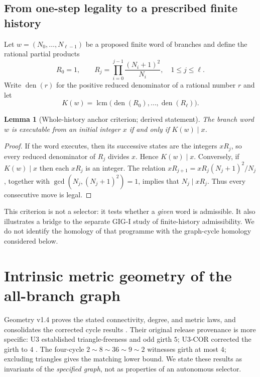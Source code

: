 \documentclass[11pt,a4paper]{article}
\newtheorem{lemma}[theorem]{Lemma}
\theoremstyle{definition}\newtheorem{definition}[theorem]{Definition}
\begin{document}
\subsection{From one-step legality to a prescribed finite history}
Let $w=(N_0,\ldots,N_{\ell-1})$ be a proposed finite word of branches and define the rational partial products
\begin{equation}\label{eq:partials}
R_0=1,\qquad R_j=\prod_{i=0}^{j-1}\frac{(N_i+1)^2}{N_i},\quad 1\le j\le\ell.
\end{equation}
Write $\operatorname{den}(r)$ for the positive reduced denominator of a rational number $r$ and let
\begin{equation}\label{eq:K}
K(w)=\operatorname{lcm}\bigl(\operatorname{den}(R_0),\ldots,\operatorname{den}(R_\ell)\bigr).
\end{equation}
\begin{lemma}[Whole-history anchor criterion; derived statement]\label{lem:history}
The branch word $w$ is executable from an initial integer $x$ if and only if $K(w)\mid x$.
\end{lemma}
\begin{proof}
If the word executes, then its successive states are the integers $xR_j$, so every reduced denominator of $R_j$ divides $x$. Hence $K(w)\mid x$. Conversely, if $K(w)\mid x$ then each $xR_j$ is an integer. The relation $xR_{j+1}=xR_j(N_j+1)^2/N_j$, together with $\gcd(N_j,(N_j+1)^2)=1$, implies that $N_j\mid xR_j$. Thus every consecutive move is legal.
\end{proof}

This criterion is not a selector: it tests whether a \emph{given} word is admissible. It also illustrates a bridge to the separate GIG-I study of finite-history admissibility. We do not identify the homology of that programme with the graph-cycle homology considered below.

\section{Intrinsic metric geometry of the all-branch graph}
\label{sec:geometry}
Geometry v1.4 proves the stated connectivity, degree, and metric laws, and consolidates the corrected cycle results \cite{geometry}. Their original release provenance is more specific: U3 established triangle-freeness and odd girth $5$; U3-COR corrected the girth to $4$ \cite{u3,u3cor}. The four-cycle $2\sim8\sim36\sim9\sim2$ witnesses girth at most $4$; excluding triangles gives the matching lower bound. We state these results as invariants of the \emph{specified graph}, not as properties of an autonomous selector.
\end{document}
